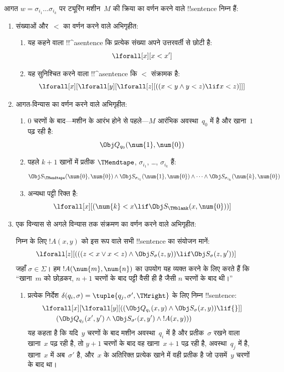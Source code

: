 \documentclass[../../../include/open-logic-section]{subfiles}
\begin{document}
आगत $w = \sigma_{i_1}\dots\sigma_{i_k}$ पर ट्यूरिंग मशीन~$M$ की क्रिया
का वर्णन करने वाले !!{sentence} निम्न हैं:
\begin{enumerate}
\item संख्याओं और~$<$ का वर्णन करने वाले अभिगृहीत:
\begin{enumerate}
\item यह कहने वाला !!^a{sentence} कि प्रत्येक संख्या अपने उत्तरवर्ती से
छोटी है:
\[
\lforall[x][x < x']
\]
\item यह सुनिश्चित करने वाला !!^a{sentence} कि $<$ संक्रामक है:
\[
\lforall[x][\lforall[y][\lforall[z][
      ((x < y \land y < z) \lif x < z)]]]
\]
\end{enumerate}
\item आगत-विन्यास का वर्णन करने वाले अभिगृहीत:
\begin{enumerate}
\item $0$ चरणों के बाद---मशीन के आरंभ होने से पहले---$M$ आरंभिक
  अवस्था~$q_0$ में है और खाना~$1$ पढ़ रही है:
\[
\Obj Q_{q_0}(\num{1}, \num{0})
\]
\item पहले $k+1$ खानों में प्रतीक $\TMendtape$, $\sigma_{i_1}$, \dots,
  $\sigma_{i_k}$ हैं:
\[
\Obj S_\TMendtape(\num{0}, \num{0}) \land
\Obj S_{\sigma_{i_1}}(\num{1}, \num{0}) \land
\dots \land
\Obj S_{\sigma_{i_k}}(\num{k}, \num{0})
\]
\item अन्यथा पट्टी रिक्त है:
\[
\lforall[x][(\num{k} < x \lif \Obj S_\TMblank(x, \num{0}))]
\]
\end{enumerate}
\item एक विन्यास से अगले विन्यास तक संक्रमण का वर्णन करने वाले अभिगृहीत:

निम्न के लिए $!A(x, y)$ को इस रूप वाले सभी !!{sentence} का संयोजन मानें:
\[
\lforall[z][
  (((z < x \lor x < z) \land \Obj S_\sigma(z, y))
  \lif \Obj S_\sigma(z, y'))]
\]
जहाँ $\sigma \in \Sigma$। हम $!A(\num{m},\num{n})$ का उपयोग यह व्यक्त
करने के लिए करते हैं कि ``खाना~$m$ को छोड़कर, $n+1$ चरणों के बाद पट्टी
वैसी ही है जैसी $n$ चरणों के बाद थी।''
\begin{enumerate}
\item {} प्रत्येक निर्देश $\delta(q_i, \sigma) =
  \tuple{q_j, \sigma', \TMright}$ के लिए निम्न !!{sentence}:
\begin{align*}
& \lforall[x][\lforall[y][(
   (\Obj Q_{q_i}(x, y) \land \Obj S_{\sigma}(x, y)) \lif {}]] \\
&\qquad   (\Obj Q_{q_j}(x', y') \land \Obj S_{\sigma'}(x, y') \land
{}!A(x, y)))
\end{align*}
यह कहता है कि यदि~$y$ चरणों के बाद मशीन अवस्था~$q_i$ में है और
प्रतीक~$\sigma$ रखने वाला खाना~$x$ पढ़ रही है, तो $y+1$ चरणों के बाद वह
खाना~$x+1$ पढ़ रही है, अवस्था~$q_j$ में है, खाना~$x$ में अब~$\sigma'$
है, और~$x$ के अतिरिक्त प्रत्येक खाने में वही प्रतीक है जो उसमें~$y$
चरणों के बाद था।


\end{enumerate}
\end{enumerate}
\end{document}

